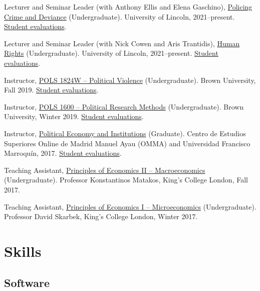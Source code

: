 \documentclass[a4paper]{article}
\renewenvironment{itemize}{
	\begin{list}{}{
			\setlength{\leftmargin}{1.5em}
		}
		}{
	\end{list}
}
\begin{document}
\begin{itemize}
\item Lecturer and Seminar Leader (with Anthony Ellis and Elena Gaschino), \href{https://blackboard.lincoln.ac.uk/ultra/courses/_182116_1/cl/outline}{Policing Crime and Deviance} (Undergraduate). University of Lincoln, 2021--present. \href{https://danilofreire.github.io/evaluations/eval-pcd-2023.xlsx}{Student evaluations}. 
\item Lecturer and Seminar Leader (with Nick Cowen and Aris Trantidis), \href{https://blackboard.lincoln.ac.uk/ultra/courses/_184943_1/cl/outline}{Human Rights} (Undergraduate). University of Lincoln, 2021--present. \href{https://danilofreire.github.io/evaluations/eval-hr-2122.xlsx}{Student evaluations}.
\item Instructor, \href{https://danilofreire.github.io/pols1824w/}{POLS 1824W -- Political Violence} (Undergraduate). Brown University, Fall 2019. \href{https://danilofreire.github.io/evaluations/eval-pol-vio.pdf}{Student evaluations}.
\item Instructor, \href{https://pols1600.github.io/}{POLS 1600 -- Political Research Methods} (Undergraduate). Brown University, Winter 2019. \href{https://danilofreire.github.io/evaluations/eval-pol-meth.pdf}{Student evaluations}.
\item Instructor, \href{https://github.com/danilofreire/economia-politica-instituicoes-ufm}{Political Economy and Institutions} (Graduate). Centro de Estudios Superiores Online de Madrid Manuel Ayau (OMMA) and Universidad Francisco Marroquín, 2017. \href{https://danilofreire.github.io/evaluations/eval-ufm.pdf}{Student evaluations}.
\item Teaching Assistant, \href{https://github.com/danilofreire/core-econ}{Principles of Economics II -- Macroeconomics} (Undergraduate). Professor Konstantinos Matakos, King's College London, Fall 2017.
\item Teaching Assistant, \href{https://github.com/danilofreire/core-econ}{Principles of Economics I -- Microeconomics} (Undergraduate). Professor David Skarbek, King's College London, Winter 2017.
\end{itemize}

\section*{Skills}

\subsection*{Software}
\end{document}
